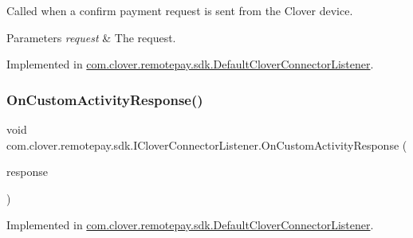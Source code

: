 Called when a confirm payment request is sent from the Clover device. 


\begin{DoxyParams}{Parameters}
{\em request} & The request.\\
\hline
\end{DoxyParams}


Implemented in \hyperlink{classcom_1_1clover_1_1remotepay_1_1sdk_1_1_default_clover_connector_listener_ae3a107836a054cedfac615a5fbe72469}{com.\+clover.\+remotepay.\+sdk.\+Default\+Clover\+Connector\+Listener}.

\mbox{\label{interfacecom_1_1clover_1_1remotepay_1_1sdk_1_1_i_clover_connector_listener_aee5ad989a0eeb2dea5149a212ca94488}} 
\subsubsection{\texorpdfstring{On\+Custom\+Activity\+Response()}{OnCustomActivityResponse()}}
{\footnotesize\ttfamily void com.\+clover.\+remotepay.\+sdk.\+I\+Clover\+Connector\+Listener.\+On\+Custom\+Activity\+Response (\begin{DoxyParamCaption}\item[{\hyperlink{classcom_1_1clover_1_1remotepay_1_1sdk_1_1_custom_activity_response}{Custom\+Activity\+Response}}]{response }\end{DoxyParamCaption})}



Implemented in \hyperlink{classcom_1_1clover_1_1remotepay_1_1sdk_1_1_default_clover_connector_listener_a874fb9be8608ea95da432b9c7230d8ea}{com.\+clover.\+remotepay.\+sdk.\+Default\+Clover\+Connector\+Listener}.

\mbox{\label{interfacecom_1_1clover_1_1remotepay_1_1sdk_1_1_i_clover_connector_listener_ad9b3f0be387c91e5f7de406b22478e39}} 
